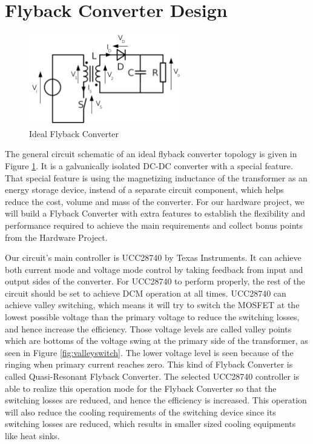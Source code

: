 \section{Flyback Converter Design}

\begin{figure}[H]
\begin{center}
\includegraphics[width=0.6\textwidth]{figures/flybacktop.png}
\caption{Ideal Flyback Converter}
\label{fig:flybacktop}
\end{center}
\end{figure}

The general circuit schematic of an ideal flyback converter topology is given in Figure \ref{fig:flybacktop}. It is a galvanically isolated DC-DC converter with a special feature. That special feature is using the magnetizing inductance of the transformer as an energy storage device, instead of a separate circuit component, which helps reduce the cost, volume and mass of the converter. For our hardware project, we will build a Flyback Converter with extra features to establish the flexibility and performance required to achieve the main requirements and collect bonus points from the Hardware Project. 
\par Our circuit's main controller is UCC28740 by Texas Instruments. It can achieve both current mode and voltage mode control by taking feedback from input and output sides of the converter. For UCC28740 to perform properly, the rest of the circuit should be set to achieve DCM operation at all times. UCC28740 can achieve valley switching, which means it will try to switch the MOSFET at the lowest possible voltage than the primary voltage to reduce the switching losses, and hence increase the efficiency. Those voltage levels are called valley points which are bottoms of the voltage swing at the primary side of the transformer, as seen in Figure \ref{fig:valleyswitch}. The lower voltage level is seen because of the ringing when primary current reaches zero. This kind of Flyback Converter is called Quasi-Resonant Flyback Converter. The selected UCC28740 controller is able to realize this operation mode for the Flyback Converter so that the switching losses are reduced, and hence the efficiency is increased. This operation will also reduce the cooling requirements of the switching device since its switching losses are reduced, which results in smaller sized cooling equipments like heat sinks.

